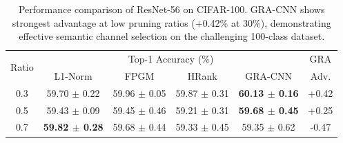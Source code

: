 
\begin{table}[h]
\centering
\caption{Performance comparison of ResNet-56 on CIFAR-100. GRA-CNN shows strongest advantage at low pruning ratios (+0.42\% at 30\%), demonstrating effective semantic channel selection on the challenging 100-class dataset.}
\label{tab:cifar100_r56_updated}
\begin{tabular}{c|cccc|c}
\toprule
\multirow{2}{*}{Ratio} & \multicolumn{4}{c|}{Top-1 Accuracy (\%)} & GRA \\
& L1-Norm & FPGM & HRank & GRA-CNN & Adv. \\
\midrule
0.3 & 59.70 $\pm$ 0.22 & 59.96 $\pm$ 0.05 & 59.87 $\pm$ 0.31 & \textbf{60.13 $\pm$ 0.16} & +0.42 \\
0.5 & 59.43 $\pm$ 0.09 & 59.45 $\pm$ 0.46 & 59.21 $\pm$ 0.31 & \textbf{59.68 $\pm$ 0.45} & +0.25 \\
0.7 & \textbf{59.82 $\pm$ 0.28} & 59.68 $\pm$ 0.44 & 59.33 $\pm$ 0.45 & 59.35 $\pm$ 0.62 & -0.47 \\
\bottomrule
\end{tabular}
\end{table}
